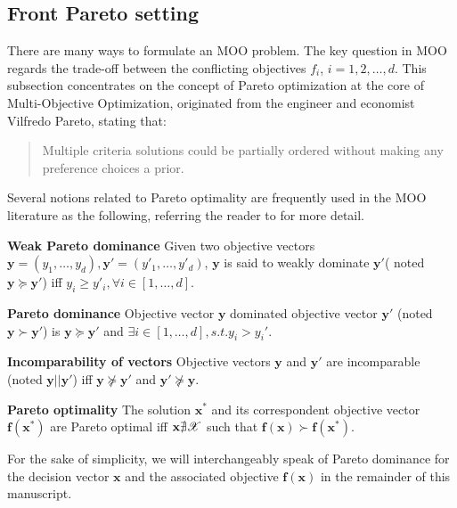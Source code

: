 \subsection{Front Pareto setting}
\label{subsec:MOMAB11}

There are many ways to formulate an MOO problem. The key question in MOO regards the trade-off between the conflicting objectives $f_i$, $i=1,2,\dots,d$. This subsection concentrates on the concept of Pareto optimization at the core of Multi-Objective Optimization, originated from the engineer and economist Vilfredo Pareto\cite{pareto1896cours}, stating that:
\begin{quote}
Multiple criteria solutions could be partially ordered without making any preference choices a prior.
\end{quote}

Several notions related to Pareto optimality are frequently used in the MOO literature as the following, referring the reader to \cite{deb2001multi} for more detail.

\begin{dfn}
\textbf{Weak Pareto dominance} Given two objective vectors $\mathbf{y} = (y_1,\dots,y_d), \mathbf{y}' = (y'_1,\dots,y'_d)$, $\mathbf{y}$ is said to weakly dominate $\mathbf{y}'$( noted $\mathbf{y}\succeq \mathbf{y}'$) iff $y_i \geqslant y'_i, \forall i \in [1,\dots,d]$.
\end{dfn}
\begin{dfn}
\textbf{Pareto dominance} Objective vector $\mathbf{y}$ dominated objective vector $\mathbf{y}'$ (noted $\mathbf{y}\succ \mathbf{y}'$) is $\mathbf{y}\succeq \mathbf{y}'$ and $\exists i\in [1,\dots,d], s.t. y_i>y_i'$.
\end{dfn}
\begin{dfn}
\textbf{Incomparability of vectors} Objective vectors $\mathbf{y}$ and $\mathbf{y}'$ are incomparable (noted $\mathbf{y}||\mathbf{y}'$) iff $\mathbf{y}\nsucceq \mathbf{y}'$ and $\mathbf{y}'\nsucceq\mathbf{y}$.
\end{dfn}
\begin{dfn}
\textbf{Pareto optimality} The solution $\mathbf{x}^{\ast}$ and its correspondent objective vector $\mathbf{f(x^{\ast})}$ are Pareto optimal iff $\mathbf{x} \nexists \mathscr{X} $ such that $\mathbf{f(x)}\succ\mathbf{f(x^{\ast})}$.
\end{dfn}

For the sake of simplicity, we will interchangeably speak of Pareto dominance for the decision vector $\mathbf{x}$ and the associated objective $\mathbf{f(x)}$ in the remainder of this manuscript. 

